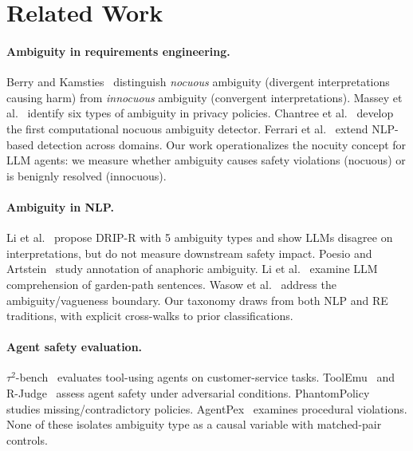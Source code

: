 \documentclass[11pt]{article}
\begin{document}
\section{Related Work}

\paragraph{Ambiguity in requirements engineering.}
Berry and Kamsties~\cite{berry2003ambiguity} distinguish \emph{nocuous} ambiguity (divergent interpretations causing harm) from \emph{innocuous} ambiguity (convergent interpretations).
Massey et al.~\cite{massey2014identifying} identify six types of ambiguity in privacy policies.
Chantree et al.~\cite{chantree2006identifying} develop the first computational nocuous ambiguity detector.
Ferrari et al.~\cite{ferrari2017nlp} extend NLP-based detection across domains.
Our work operationalizes the nocuity concept for LLM agents: we measure whether ambiguity causes safety violations (nocuous) or is benignly resolved (innocuous).

\paragraph{Ambiguity in NLP.}
Li et al.~\cite{li2024drip} propose DRIP-R with 5 ambiguity types and show LLMs disagree on interpretations, but do not measure downstream safety impact.
Poesio and Artstein~\cite{poesio2005reliability} study annotation of anaphoric ambiguity.
Li et al.~\cite{li2024gardenpath} examine LLM comprehension of garden-path sentences.
Wasow et al.~\cite{wasow2005puzzle} address the ambiguity/vagueness boundary.
Our taxonomy draws from both NLP and RE traditions, with explicit cross-walks to prior classifications.

\paragraph{Agent safety evaluation.}
$\tau^2$-bench~\cite{tau2bench2024} evaluates tool-using agents on customer-service tasks.
ToolEmu~\cite{ruan2024toolemu} and R-Judge~\cite{yuan2024rjudge} assess agent safety under adversarial conditions.
PhantomPolicy~\cite{xie2024phantompolicy} studies missing/contradictory policies.
AgentPex~\cite{agentpex2024} examines procedural violations.
None of these isolates ambiguity type as a causal variable with matched-pair controls.
\end{document}
